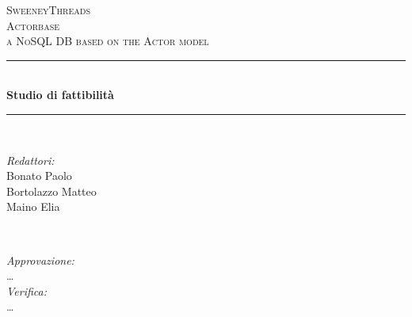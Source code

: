 \documentclass[a4paper]{report}
\begin{document}
	
	\begin{titlepage}
		\newcommand{\HRule}{\rule{\linewidth}{0.5mm}} 
		\center  
		
		\textsc{\LARGE SweeneyThreads}\\[1.5cm] 
		\textsc{\Large Actorbase}\\[0.5cm] 
		\textsc{\large a NoSQL DB based on the Actor model}\\[0.5cm]
		
		
		\HRule \\[0.4cm]
		{ \huge \bfseries Studio di fattibilità}\\[0.4cm] 
		\HRule \\[1.5cm]
		
		\begin{minipage}{0.4\textwidth}
			\begin{flushleft} \large
				\emph{Redattori:}\\
				Bonato Paolo \\
				Bortolazzo Matteo \\
				Maino Elia \\
			\end{flushleft}
		\end{minipage}
		~
		\begin{minipage}{0.4\textwidth}
			\begin{flushright} \large
				\emph{Approvazione:} \\
				\dots \\
				\emph{Verifica:} \\
				\dots
			\end{flushright}
		\end{minipage}
		

\end{titlepage}
\end{document}
